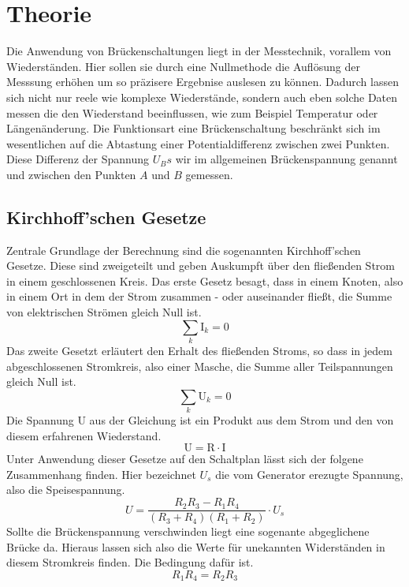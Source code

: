 \section{Theorie}
Die Anwendung von Brückenschaltungen liegt in der Messtechnik,  vorallem von Wiederständen. 
Hier sollen sie durch eine Nullmethode die Auflösung der Messsung erhöhen um so präzisere Ergebnise
auslesen zu können. Dadurch lassen sich nicht nur reele wie komplexe Wiederstände, sondern auch eben 
solche Daten messen die den Wiederstand beeinflussen, wie zum Beispiel Temperatur oder Längenänderung. %
Die Funktionsart eine Brückenschaltung beschränkt sich im wesentlichen auf die Abtastung einer 
Potentialdifferenz zwischen zwei Punkten. 
Diese Differenz der Spannung $U_Bs$ wir im allgemeinen Brückenspannung genannt und zwischen den Punkten $A$ und $B$ gemessen.




\subsection{Kirchhoff'schen Gesetze}
Zentrale Grundlage der Berechnung sind die sogenannten Kirchhoff'schen Gesetze. Diese sind zweigeteilt und 
geben Auskumpft über den fließenden Strom in einem geschlossenen Kreis.
Das erste Gesetz besagt, dass in einem Knoten, also in einem Ort in dem der Strom zusammen - oder auseinander fließt, 
die Summe von elektrischen Strömen gleich Null ist.
\begin{equation}
    \sum_k \text{I}_k = 0
\end{equation}
Das zweite Gesetzt erläutert den Erhalt des fließenden Stroms, so dass in jedem abgeschlossenen Stromkreis, also einer Masche,
die Summe aller Teilspannungen gleich Null ist.
\begin{equation}
    \label{eqn:kirch2}
    \sum_k \text{U}_k = 0
\end{equation}
Die Spannung U aus der Gleichung ist ein Produkt aus dem Strom und den von diesem erfahrenen Wiederstand.
\begin{equation}
    \text{U} = \text{R}\cdot \text{I}
\end{equation}
Unter Anwendung dieser Gesetze auf den Schaltplan %
lässt sich der folgene Zusammenhang finden. Hier bezeichnet $U_s$ die vom Generator erezugte Spannung, also die Speisespannung. 
\begin{equation}
     U= \frac{R_2R_3 - R_1R_4}{(R_3+R_4)(R_1+R_2)}\cdot U_s
\end{equation}
Sollte die Brückenspannung verschwinden liegt eine sogenante abgeglichene Brücke da. 
Hieraus lassen sich also die Werte für unekannten Widerständen in diesem Stromkreis finden.
Die Bedingung dafür ist.
\begin{equation}
    \label{eqn:bedingung}
    R_1 R_4 = R_2 R_3
\end{equation}

